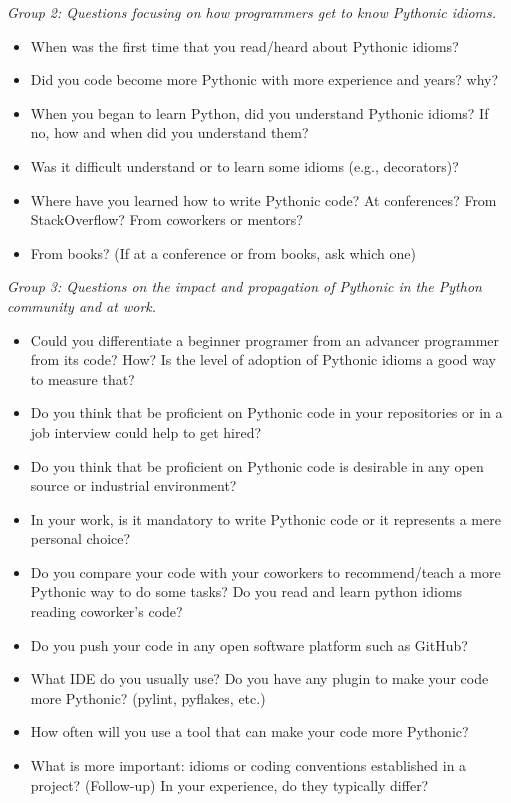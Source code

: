 \documentclass[a4paper]{article}
\begin{document}
\textit{Group 2: Questions focusing on how programmers get to know Pythonic idioms.}
\begin{itemize}
  \item When was the first time that you read/heard about Pythonic idioms?
  \item Did you code become more Pythonic with more experience and years? why?
  \item When you began to learn Python, did you understand Pythonic idioms? If no, how and when did you understand them?
  \item Was it difficult understand or to learn some idioms (e.g., decorators)?
  \item Where have you learned how to write Pythonic code? At conferences? From StackOverflow? From coworkers or mentors? \item From books? (If at a conference or from books, ask which one)
\end{itemize}

\textit{Group 3: Questions on the impact and propagation of Pythonic in the Python community and at work.}
\begin{itemize}
  \item Could you differentiate a beginner programer from an advancer programmer from its code? How? Is the level of adoption of Pythonic idioms a good way to measure that?
  \item Do you think that be proficient on Pythonic code in your repositories or in a job interview could help to get hired?
  \item Do you think that be proficient on Pythonic code is desirable in any open source or industrial environment?
  \item In your work, is it mandatory to write Pythonic code or it represents a mere personal choice?
  \item Do you compare your code with your coworkers to recommend/teach a more Pythonic way to do some tasks? Do you read and learn python idioms reading coworker's code?
  \item Do you push your code in any open software platform such as GitHub? 
  \item What IDE do you usually use? Do you have any plugin to make your code more Pythonic? (pylint, pyflakes, etc.)
  \item How often will you use a tool that can make your code more Pythonic?
  \item What is more important: idioms or coding conventions established in a project?
  (Follow-up) In your experience, do they typically differ?
\end{itemize}


% 
%

\end{document}
